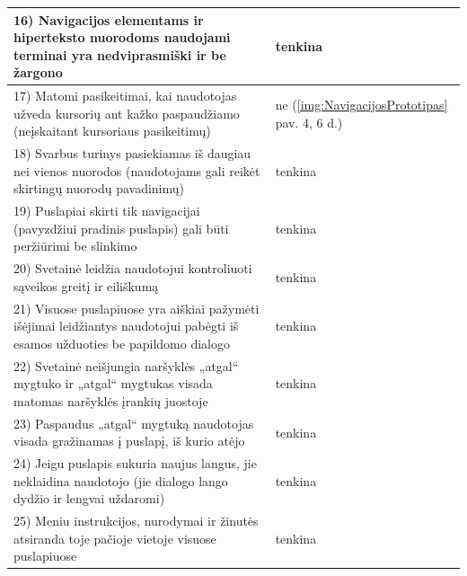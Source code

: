 \documentclass{VUMIFPSbakalaurinis}
\begin{document}
\begin{longtable}{ |p{}|p{}| }
	16) Navigacijos elementams ir hiperteksto nuorodoms naudojami terminai yra nedviprasmiški ir be žargono & tenkina \\ \hline
	17) Matomi pasikeitimai, kai naudotojas užveda kursorių ant kažko paspaudžiamo (neįskaitant kursoriaus pasikeitimų) & ne (\ref{img:NavigacijosPrototipas} pav. 4, 6 d.) \\ \hline
	18) Svarbus turinys pasiekiamas iš daugiau nei vienos nuorodos (naudotojams gali reikėt skirtingų nuorodų pavadinimų) & tenkina \\ \hline
	19) Puslapiai skirti tik navigacijai (pavyzdžiui pradinis puslapis) gali būti peržiūrimi be slinkimo & tenkina \\ \hline
	20) Svetainė leidžia naudotojui kontroliuoti sąveikos greitį ir eiliškumą & tenkina \\ \hline
	21) Visuose puslapiuose yra aiškiai pažymėti išėjimai leidžiantys naudotojui pabėgti iš esamos užduoties be papildomo dialogo & tenkina \\ \hline
	22) Svetainė neišjungia naršyklės „atgal“ mygtuko ir „atgal“ mygtukas visada matomas naršyklės įrankių juostoje & tenkina \\ \hline
	23) Paspaudus „atgal“ mygtuką naudotojas visada gražinamas į puslapį, iš kurio atėjo & tenkina \\ \hline
	24) Jeigu puslapis sukuria naujus langus, jie neklaidina naudotojo (jie dialogo lango dydžio ir lengvai uždaromi) & tenkina \\ \hline
	25) Meniu instrukcijos, nurodymai ir žinutės atsiranda toje pačioje vietoje visuose puslapiuose & tenkina \\ \hline
\end{longtable}
\label{NavigacijosirIALentelėPrad}
\addtocounter{table}{-1}
\setlength{\parindent}{1cm}
\end{document}

